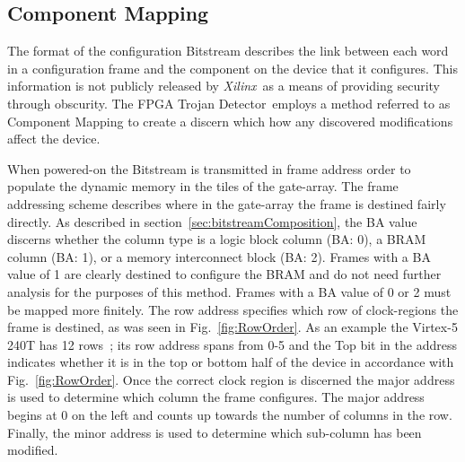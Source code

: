\documentclass[conference]{IEEEtran}
\newcommand{\Xilinx}{\textit{\gls{Xilinx}}~}
\newcommand{\Name}{\acrshort{FPGA} Trojan Detector}
\newcommand{\NameNoPeriod}{\Name~}
\begin{document}
\subsection{Component Mapping} \label{sec:tileMapping}
The format of the configuration \gls{Bitstream} describes the link between each word in a configuration frame and the component on the device that it configures. This information is not publicly released by \Xilinx as a means of providing security through obscurity.
The \NameNoPeriod employs a method referred to as Component Mapping to create a discern which how any discovered modifications affect the device.

When powered-on the \gls{Bitstream} is transmitted in frame address order to populate the dynamic memory in the tiles of the gate-array.
The frame addressing scheme describes where in the gate-array the frame is destined fairly directly.
As described in section~\ref{sec:bitstreamComposition}, the \acrfull{BA} value discerns whether the column type is a logic block column (BA: 0), a \acrfull{BRAM} column (BA: 1), or a memory interconnect block (BA: 2).
Frames with a \acrshort{BA} value of 1 are clearly destined to configure the \acrshort{BRAM} and do not need further analysis for the purposes of this method.
Frames with a \acrshort{BA} value of 0 or 2 must be mapped more finitely.
The row address specifies which row of clock-regions the frame is destined, as was seen in Fig.~\ref{fig:RowOrder}.
As an example the Virtex-5 240T has 12 rows~\cite{virtex5ConfigGuide}; its row address spans from 0-5 and the Top bit in the address indicates whether it is in the top or bottom half of the device in accordance with Fig.~\ref{fig:RowOrder}.
Once the correct clock region is discerned the major address is used to determine which column the frame configures.
The major address begins at 0 on the left and counts up towards the number of columns in the row.
Finally, the minor address is used to determine which sub-column has been modified.
\end{document}
